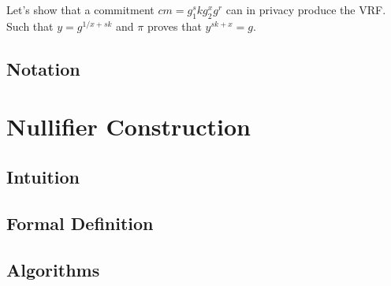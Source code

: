 Let's show that a commitment $cm = g_1^sk g_2^x g^r$ can in privacy produce the VRF.
Such that $y = g^{1/x + sk}$ and $\pi$ proves that  $y^{sk + x} = g$.



















































\subsection{Notation}

\section{Nullifier Construction}
\subsection{Intuition}
% 

\subsection{Formal Definition}

\subsection{Algorithms}

